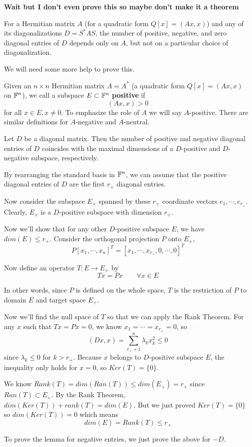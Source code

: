 \begin{theorem}
\textbf{Wait but I don't even prove this so maybe don't make it a theorem}

For a Hermitian matrix $A$ (for a quadratic form $Q[x] = (Ax, x)$) and any of its diagonalizations $D = S^{*} AS$, the number of positive, negative, and zero diagonal entries of $D$ depends only on $A$, but not on a particular choice of diagonalization. 
\end{theorem}

We will need some more help to prove this. 

\begin{definition}
Given an $n \times n$ Hermitian matrix $A = A^{*}$ (a quadratic form $Q[x] = (Ax, x)$ on $\mathbb{F}^{n}$), we call a subspace $E \subset \mathbb{F}^{n}$ \textbf{positive} if 
$$(Ax, x) > 0$$ 
for all $x \in E, x \neq 0$. To emphasize the role of $A$ we will say $A$-positive. There are similar definitions for $A$-negative and $A$-neutral. 
\end{definition}

\begin{lemma}
Let $D$ be a diagonal matrix. Then the number of positive and negative diagonal entries of $D$ coincides with the maximal dimensions of a $D$-positive and $D$-negative subspace, respectively. 
\end{lemma}

\begin{lproof}
By rearranging the standard basis in $\mathbb{F}^{n}$, we can assume that the positive diagonal entries of $D$ are the first $r_{+}$ diagonal entries. 

Now consider the subspace $E_{+}$ spanned by these $r_{+}$ coordinate vectors $e_{1}, \cdots, e_{r_{+}}$. Clearly, $E_{+}$ is a $D$-positive subspace with dimension $r_{+}$. 

Now we'll show that for any other $D$-positive subspace $E$, we have $dim(E) \leq r_{+}$. Consider the orthogonal projection $P$ onto $E_{+}$, 
$$P[x_{1}, \cdots, x_{n}]^{T} = [x_{1}, \cdots, x_{r_{+}}, 0, \cdots, 0]^{T}$$

Now define an operator $T: E \rightarrow E_{+}$ by 
$$Tx = Px \qquad \forall x \in E$$

In other words, since $P$ is defined on the whole space, $T$ is the restriction of $P$ to domain $E$ and target space $E_{+}$. 

Now we'll find the null space of $T$ so that we can apply the Rank Theorem. For any $x$ such that $Tx = Px = 0$, we know $x_{1} = \cdots = x_{r_{+}} = 0$, so 
$$(Dx, x) = \sum_{r_{+} + 1}^{n} \lambda_{k} x_{k}^{2} \leq 0$$
since $\lambda_{k} \leq 0$ for $k > r_{+}$. Because $x$ belongs to $D$-positive subspace $E$, the inequality only holds for $x = 0$, so $Ker(T) = \{0\}$. 

We know $Rank(T) = dim(Ran(T)) \leq dim(E_{+}) = r_{+}$ since $Ran(T) \subset	E_{+}$. By the Rank Theorem, $dim(Ker(T)) + rank(T) = dim(E)$. But we just proved $Ker(T) = \{0\}$ so $dim(Ker(T)) = 0$ which means 
$$dim(E) = Rank(T) \leq r_{+}$$

To prove the lemma for negative entries, we just prove the above for $-D$. 
\end{lproof}

